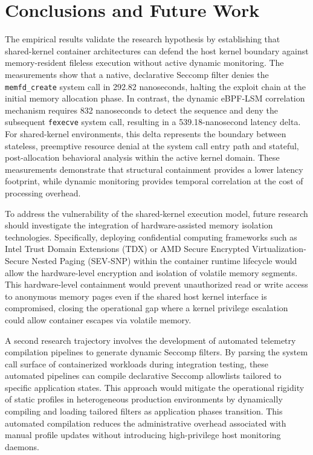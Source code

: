 %
%
%
%
\section*{Conclusions and Future Work}


The empirical results validate the research hypothesis by establishing that shared-kernel container architectures can defend the host kernel boundary against memory-resident fileless execution without active dynamic monitoring. The measurements show that a native, declarative Seccomp filter denies the \texttt{memfd\_create} system call in 292.82 nanoseconds, halting the exploit chain at the initial memory allocation phase. In contrast, the dynamic eBPF-LSM correlation mechanism requires 832 nanoseconds to detect the sequence and deny the subsequent \texttt{fexecve} system call, resulting in a 539.18-nanosecond latency delta. For shared-kernel environments, this delta represents the boundary between stateless, preemptive resource denial at the system call entry path and stateful, post-allocation behavioral analysis within the active kernel domain. These measurements demonstrate that structural containment provides a lower latency footprint, while dynamic monitoring provides temporal correlation at the cost of processing overhead.

To address the vulnerability of the shared-kernel execution model, future research should investigate the integration of hardware-assisted memory isolation technologies. Specifically, deploying confidential computing frameworks such as Intel Trust Domain Extensions (TDX) or AMD Secure Encrypted Virtualization-Secure Nested Paging (SEV-SNP) within the container runtime lifecycle would allow the hardware-level encryption and isolation of volatile memory segments. This hardware-level containment would prevent unauthorized read or write access to anonymous memory pages even if the shared host kernel interface is compromised, closing the operational gap where a kernel privilege escalation could allow container escapes via volatile memory.

A second research trajectory involves the development of automated telemetry compilation pipelines to generate dynamic Seccomp filters. By parsing the system call surface of containerized workloads during integration testing, these automated pipelines can compile declarative Seccomp allowlists tailored to specific application states. This approach would mitigate the operational rigidity of static profiles in heterogeneous production environments by dynamically compiling and loading tailored filters as application phases transition. This automated compilation reduces the administrative overhead associated with manual profile updates without introducing high-privilege host monitoring daemons.

